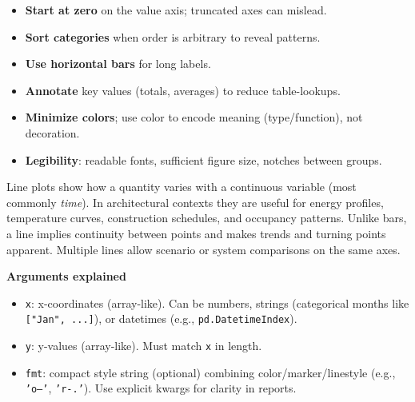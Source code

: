 \begin{itemize}
    \item \textbf{Start at zero} on the value axis; truncated axes can mislead.
    \item \textbf{Sort categories} when order is arbitrary to reveal patterns.
    \item \textbf{Use horizontal bars} for long labels.
    \item \textbf{Annotate} key values (totals, averages) to reduce table-lookups.
    \item \textbf{Minimize colors}; use color to encode meaning (type/function), not decoration.
    \item \textbf{Legibility}: readable fonts, sufficient figure size, notches between groups.
\end{itemize}



Line plots show how a quantity varies with a continuous variable (most commonly \emph{time}). In architectural contexts they are useful for energy profiles, temperature curves, construction schedules, and occupancy patterns. Unlike bars, a line implies continuity between points and makes trends and turning points apparent. Multiple lines allow scenario or system comparisons on the same axes.



\textbf{Arguments explained}
\begin{itemize}
    \item \texttt{x}: x-coordinates (array-like). Can be numbers, strings (categorical months like \texttt{["Jan", ...]}), or datetimes (e.g., \texttt{pd.DatetimeIndex}).
    \item \texttt{y}: y-values (array-like). Must match \texttt{x} in length.
    \item \texttt{fmt}: compact style string (optional) combining color/marker/linestyle (e.g., \texttt{'o--'}, \texttt{'r-.'}). Use explicit kwargs for clarity in reports.
\end{itemize}

